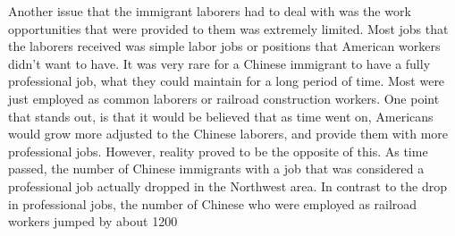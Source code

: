 \documentclass[12pt, twoside]{article}
\begin{document}
Another issue that the immigrant laborers had to deal with was the work opportunities that were provided to them was extremely limited. Most jobs that the laborers received was simple labor jobs or positions that American workers didn't want to have. It was very rare for a Chinese immigrant to have a fully professional job, what they could maintain for a long period of time. Most were just employed as common laborers or railroad construction workers. One point that stands out, is that it would be believed that as time went on, Americans would grow more adjusted to the Chinese laborers, and provide them with more professional jobs. However, reality proved to be the opposite of this. As time passed, the number of Chinese immigrants with a job that was considered a professional job actually dropped in the Northwest area. In contrast to the drop in professional jobs, the number of Chinese who were employed as railroad workers jumped by about 1200%
\par
\end{document}
